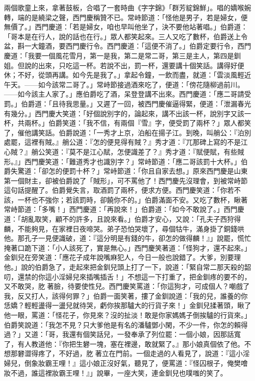 兩個歌童上來，拿著鼓板，合唱了一套時曲《字字錦》「群芳綻錦鮮」。唱的嬌喉婉轉，端的是繞梁之聲，西門慶稱贊不已。常峙節道：「怪他是男子，若是婦女，便無價了。」西門慶道：「若是婦女，咱也早叫他坐了，決不要他站著唱。」伯爵道：「哥本是在行人，說的話也在行。」眾人都笑起來。三人又吃了數杯，伯爵送上令盆，斟一大鐘酒，要西門慶行令。西門慶道：「這便不消了。」伯爵定要行令，西門慶道：「我要一個風花雪月，第一是我，第二是常二哥，第三是主人，第四是釧姐。但說的出來，只吃這一杯。若說不出，罰一杯，還要講十個笑話。講得好便休；不好，從頭再講。如今先是我了。」拿起令鐘，一飲而盡，就道：「雲淡風輕近午天。——如今該常二哥了。」常峙節接過酒來吃了，便道：「傍花隨柳過前川。——如今該主人家了。」應伯爵吃了酒，呆登登講不出來。西門慶道：「應二哥請受罰。」伯爵道：「且待我思量。」又遲了一回，被西門慶催逼得緊，便道：「泄漏春光有幾分。」西門慶大笑道：「好個說別字的，論起來，講不出該一杯，說別字又該一杯，共兩杯。」伯爵笑道：「我不信，有兩個『雪』字，便受罰了兩杯？」眾人都笑了，催他講笑話。伯爵說道：「一秀才上京，泊船在揚子江。到晚，叫艄公：『泊別處罷，這裡有賊。』艄公道：『怎的便見得有賊？』秀才道：『兀那碑上寫的不是江心賊？』艄公笑道：『莫不是江心賦，怎便識差了？』秀才道：『賦便賦，有些賊形。』」西門慶笑道：「難道秀才也識別字？」常峙節道：「應二哥該罰十大杯。」伯爵失驚道：「卻怎的便罰十杯？」常峙節道：「你且自家去想。」原來西門慶是山東第一個財主，卻被伯爵說了「賊形」，可不罵他了！西門慶先沒理會，到被常峙節這句話提醒了。伯爵覺失言，取酒罰了兩杯，便求方便。西門慶笑道：「你若不該，一杯也不強你；若該罰時，卻饒你不的。」伯爵滿面不安。又吃了數杯，瞅著常峙節道：「多嘴！」西門慶道：「再說來！」伯爵道：「如今不敢說了。」西門慶道：「胡亂取笑，顧不的許多，且說來看。」伯爵才安心，又說：「孔夫子西狩得麟，不能夠見，在家裡日夜啼哭。弟子恐怕哭壞了，尋個牯牛，滿身掛了銅錢哄他。那孔子一見便識破，道：『這分明是有錢的牛，卻怎的做得麟！』」說罷，慌忙掩著口跪下道：「小人該死了，實是無心。」西門慶笑著道：「怪狗才，還不起來。」金釧兒在旁笑道：「應花子成年說嘴麻犯人，今日一般也說錯了。大爹，別要理他。」說的伯爵急了，走起來把金釧兒頭上打了一下，說道：「緊自常二那天殺的韶叨，還禁的你這小淫婦兒來插嘴插舌！」不想這一下打重了，把金釧疼的要不的，又不敢哭，肐𦡗著臉，待要使性兒。西門慶笑罵道：「你這狗才，可成個人？嘲戲了我，反又打人，該得何罪？」伯爵一面笑著，摟了金釧說道：「我的兒，誰養的你恁嬌？輕輕盪得一盪兒就待哭，虧你挨那驢大的行貨子來！」金釧兒揉著頭，瞅了他一眼，罵道：「怪花子，你見來？沒的扯淡！敢是你家媽媽子倒挨驢的行貨來。」伯爵笑說道：「我怎不見？只大爹他是有名的潘驢鄧小閑，不少一件，你怎的賴得過？」又道：「哥，我還有個笑話兒，一發奉承了列位罷：一個小娘，因那話寬了，有人教道他：『你把生礬一塊，塞在裡邊，敢就緊了。』那小娘真個依了他。不想那礬澀得疼了，不好過，肐𦡗著立在門前。一個走過的人看見了，說道：『這小淫婦兒，倒象妝霸王哩！』這小娘正沒好氣，聽見了，便罵道：『怪囚根子，俺樊噲妝不過，誰這裡妝霸王哩！』」說畢，一座大笑，連金釧兒也噗嗤的笑了。

